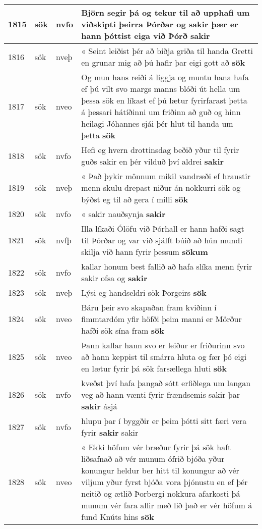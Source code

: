 \documentclass{article}
\begin{document}
\begin{longtable}{p{1cm}|p{1cm}|p{1cm}|p{13cm}}
\hline
1815&sök&nvfo&Björn segir þá og tekur til að upphafi um viðskipti þeirra Þórðar og sakir þær er hann þóttist eiga við Þórð \textbf{sakir} \\
\hline
1816&sök&nveþ&« Seint leiðist þér að biðja griða til handa Gretti en grunar mig að þú hafir þar eigi gott að \textbf{sök} \\
\hline
1817&sök&nveo&Og mun hans reiði á liggja og muntu hana hafa ef þú vilt svo margs manns blóði út hella um þessa sök en líkast ef þú lætur fyrirfarast þetta á þessari hátíðinni um friðinn að guð og hinn heilagi Jóhannes sjái þér hlut til handa um þetta \textbf{sök} \\
\hline
1818&sök&nvfo&Hefi eg hvern drottinsdag beðið yður til fyrir guðs sakir en þér vilduð því aldrei \textbf{sakir} \\
\hline
1819&sök&nveþ&« Það þykir mönnum mikil vandræði ef hraustir menn skulu drepast niður án nokkurri sök og býðst eg til að gera í milli \textbf{sök} \\
\hline
1820&sök&nvfo&« sakir nauðsynja \textbf{sakir} \\
\hline
1821&sök&nvfþ&Illa líkaði Ólöfu við Þórhall er hann hafði sagt til Þórðar og var við sjálft búið að hún mundi skilja við hann fyrir þessum \textbf{sökum} \\
\hline
1822&sök&nvfo&kallar honum best fallið að hafa slíka menn fyrir sakir ofsa og \textbf{sakir} \\
\hline
1823&sök&nveþ&Lýsi eg handseldri sök Þorgeirs \textbf{sök} \\
\hline
1824&sök&nveo&Báru þeir svo skapaðan fram kviðinn í fimmtardóm yfir höfði þeim manni er Mörður hafði sök sína fram \textbf{sök} \\
\hline
1825&sök&nveo&Þann kallar hann svo er leiður er friðurinn svo að hann keppist til smárra hluta og fær þó eigi en lætur fyrir þá sök farsællega hluti \textbf{sök} \\
\hline
1826&sök&nvfo&kveðst því hafa þangað sótt erfiðlega um langan veg að hann vænti fyrir frændsemis sakir þar \textbf{sakir} ásjá\\
\hline
1827&sök&nvfo&hlupu þar í byggðir er þeim þótti sitt færi vera fyrir \textbf{sakir} sakir\\
\hline
1828&sök&nveo&« Ekki höfum vér bræður fyrir þá sök haft liðsafnað að vér munum ófrið bjóða yður konungur heldur ber hitt til konungur að vér viljum yður fyrst bjóða vora þjónustu en ef þér neitið og ætlið Þorbergi nokkura afarkosti þá munum vér fara allir með lið það er vér höfum á fund Knúts hins \textbf{sök} \\

\end{longtable}
\end{document}

